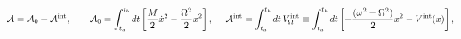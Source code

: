 \begin{equation}
{\cal A}=
{\cal A}_0
+
{\cal A}^{\rm int},~~~~~~
{\cal A}_0=\int_{t_a}^{t_b} dt
\left[\frac{M}{2}\dot x^2-\frac{ \Omega ^2}{2}x^2\right] ,~~~~
{\cal A}^{\rm int}=
\int_{t_a}^{t_b} dt\,V^{\rm int}_{\Omega}\equiv
\int_{t_a}^{t_b} dt\left[
-\frac{( \omega ^2- \Omega ^2)}{2}x^2-V^{\rm int}(x)\right] ,
\label{@}\end{equation}

